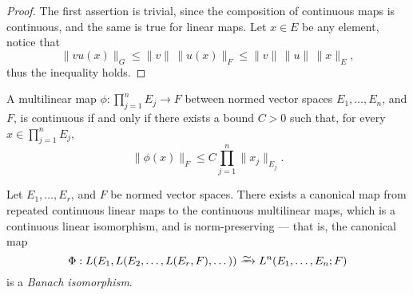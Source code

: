 \begin{proof}
    The first assertion is trivial, since the composition of continuous maps is
    continuous, and the same is true for linear maps. Let \(x \in E\) be any element,
    notice that
    \[
        \|vu(x)\|_G
        \leq \|v\|\, \|u(x)\|_F
        \leq \|v\|\, \|u\|\, \|x\|_{E},
    \]
    thus the inequality holds.
\end{proof}

\begin{proposition}
    \label{prop:multilinear-continous-iff-bounded}
    A multilinear map \(\phi: \prod_{j=1}^n E_j \to F\) between normed vector spaces
    \(E_1, \dots, E_n\), and \(F\), is continuous if and only if there exists a bound
    \(C > 0\) such that, for every \(x \in \prod_{j = 1}^n E_j\),
    \[
        \|\phi(x)\|_{F} \leq C \prod_{j=1}^n \|x_j\|_{E_j}.
    \]
\end{proposition}

\begin{proposition}
    \label{prop:canonical-iso-banach-multilinear}
    Let \(E_1, \dots, E_r\), and \(F\) be normed vector spaces. There exists a
    canonical map from repeated continuous linear maps to the continuous multilinear
    maps, which is a continuous linear isomorphism, and is norm-preserving --- that
    is, the canonical map
    \[
        \Phi: L(E_1, L(E_2, \dots, L(E_r, F), \dots)) \isoto L^n(E_1, \dots, E_n; F)
    \]
    is a \emph{Banach isomorphism}.
\end{proposition}

